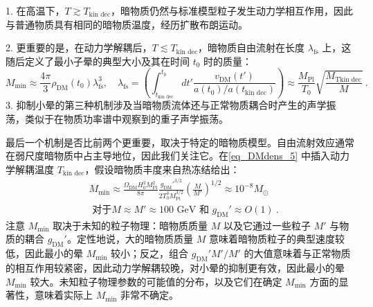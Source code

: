 1. 在高温下，\( T \gtrsim T_{\text{kin dec}} \)，暗物质仍然与标准模型粒子发生动力学相互作用，因此与普通物质具有相同的暗物质温度，经历扩散布朗运动。

2. 更重要的是，在动力学解耦后，\( T \lesssim T_{\text{kin dec}} \)，暗物质自由流射在长度 \( \lambda_{\text{fs}} \) 上，这随后定义了最小子晕的典型大小及其在时间 \( t_0 \) 时的质量：
\begin{equation}\label{eq_DMdens_5}
M_{\text{min}} \approx \frac{4\pi}{3} \rho_{\text{DM}}(t_0) \lambda_{\text{fs}}^3, \quad \lambda_{\text{fs}} = \left( \int_{t_{\text{kin dec}}}^{t_0} dt' \frac{v_{\text{DM}}(t')}{a(t_0)/a(t_{\text{kin dec}})} \right) \approx \frac{M_{\text{Pl}}}{T_0} \sqrt{\frac{M_{\text{Tkin dec}}}{M}}~. 
\end{equation}
3. 抑制小晕的第三种机制涉及当暗物质流体还与正常物质耦合时产生的声学振荡，类似于在物质功率谱中观察到的重子声学振荡。

最后一个机制是否比前两个更重要，取决于特定的暗物质模型。自由流射效应通常在弱尺度暗物质中占主导地位，因此我们关注它。在\autoref{eq_DMdens_5} 中插入动力学解耦温度 \( T_{\text{kin dec}} \)，假设暗物质丰度来自热冻结给出：
\begin{equation}
\begin{aligned}
& M_{\text{min}} \approx \frac{\Omega_{\text{DM}} H_0^2 M_{\text{Pl}}^2}{8\pi} \frac{g_{\text{DM}}'^{3/2}}{2T_0^3 M_{\text{Pl}}^{3/2}} \left(\frac{M}{M'}\right)^{1/2} \approx 10^{-8} M_\odot \\  
& \text{ 对于} M \approx M' \approx 100 \text{ GeV 和 } g_{\text{DM}}' \approx O(1)~. 
\end{aligned}
\end{equation}
注意 \( M_{\text{min}} \) 取决于未知的粒子物理：暗物质质量 \( M \) 以及它通过一些粒子 \( M' \) 与物质的耦合 \( g_{\text{DM}}' \)。定性地说，大的暗物质质量 \( M \) 意味着暗物质粒子的典型速度较低，因此最小的晕 \( M_{\text{min}} \) 较小；反之，组合 \( g_{\text{DM}}' M'/M' \) 的大值意味着与正常物质的相互作用较紧密，因此动力学解耦较晚，对小晕的抑制更有效，因此最小的晕 \( M_{\text{min}} \) 较大。未知粒子物理参数的可能值的分布，以及它们在确定 \( M_{\text{min}} \) 方面的显著性，意味着实际上 \( M_{\text{min}} \) 非常不确定。
 








